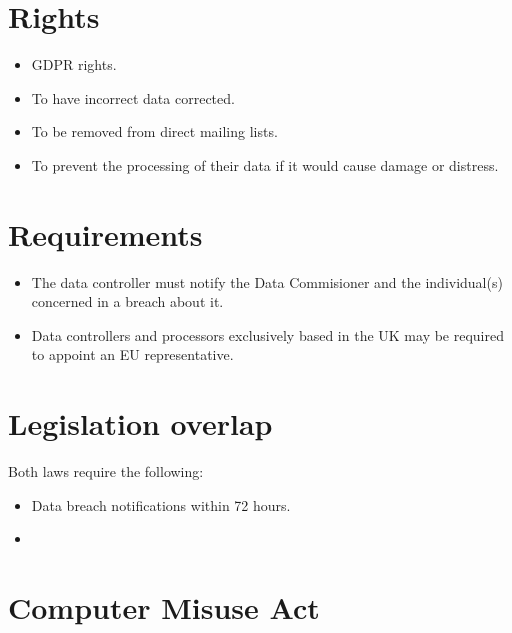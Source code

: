 \documentclass[12pt]{report}
\begin{document}
\section{Rights}
\begin{itemize}
	\item GDPR rights.
	\item To have incorrect data corrected.
	\item To be removed from direct mailing lists.
	\item To prevent the processing of their data if it would cause damage or distress.
\end{itemize}

\section{Requirements}
\begin{itemize}
	\item The data controller must notify the Data Commisioner and the individual(s) concerned in a breach about it.
	\item Data controllers and processors exclusively based in the UK may be required to appoint an EU representative.
\end{itemize}

\section{Legislation overlap}
Both laws require the following:
\begin{itemize}
	\item Data breach notifications within 72 hours.
	\item 
\end{itemize}

\pagebreak

\section{Computer Misuse Act}
\end{document}

